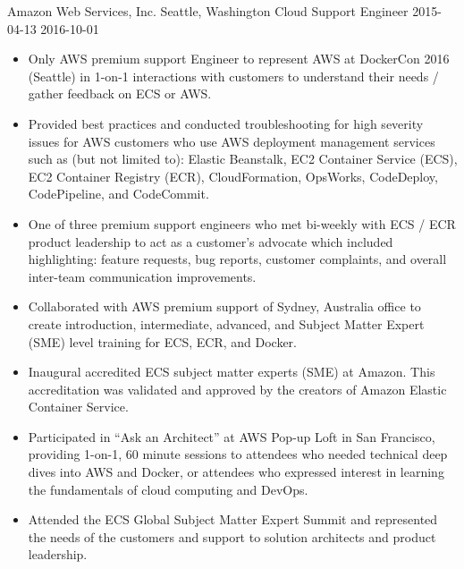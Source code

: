 \roleheader
    {Amazon Web Services, Inc.}
    {Seattle, Washington}
    {Cloud Support Engineer }
    {2015-04-13}
    {2016-10-01}

\begin{itemize}
    \item Only AWS premium support Engineer to represent AWS at DockerCon 2016 (Seattle) in 1-on-1 interactions with customers to understand their needs / gather feedback on ECS or AWS.
    \item Provided best practices and conducted troubleshooting for high severity issues for AWS customers who use AWS deployment management services such as (but not limited to): Elastic Beanstalk, EC2 Container Service (ECS), EC2 Container Registry (ECR), CloudFormation, OpsWorks, CodeDeploy, CodePipeline, and CodeCommit.
    \item One of three premium support engineers who met bi-weekly with ECS / ECR product leadership to act as a customer's advocate which included highlighting: feature requests, bug reports, customer complaints, and overall inter-team communication improvements.
    \item Collaborated with AWS premium support of Sydney, Australia office to create introduction, intermediate, advanced, and Subject Matter Expert (SME) level training for ECS, ECR, and Docker.
    \item Inaugural accredited ECS subject matter experts (SME) at Amazon. This accreditation was validated and approved by the creators of Amazon Elastic Container Service. 
    \item Participated in ``Ask an Architect'' at AWS Pop-up Loft in San Francisco, providing 1-on-1, 60 minute sessions to attendees who needed technical deep dives into AWS and Docker, or attendees who expressed interest in learning the fundamentals of cloud computing and DevOps.
    \item Attended the ECS Global Subject Matter Expert Summit and represented the needs of the customers and support to solution architects and product leadership.
\end{itemize}